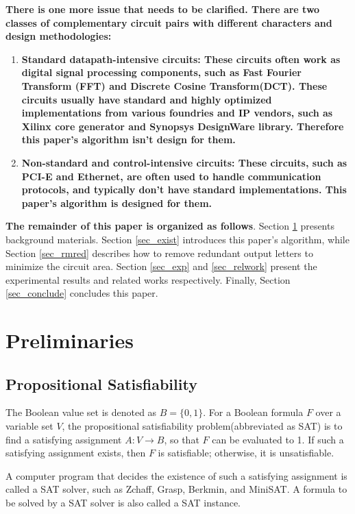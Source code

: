 \documentclass[journal]{IEEEtran}
\begin{document}
\textbf{There is one more issue that needs to be clarified.
There are two classes of complementary circuit pairs with different characters and design methodologies:}
\begin{enumerate}
  \item \textbf{Standard datapath-intensive circuits:
  These circuits often work as digital signal processing components, such as
      Fast Fourier Transform (FFT) and
      Discrete Cosine Transform(DCT).
      These circuits usually have standard and highly optimized implementations from various foundries and IP vendors,
      such as Xilinx core generator\cite{CoreGen} and Synopsys DesignWare library\cite{DesignWare}.
      Therefore this paper's algorithm isn't design for them.}
  \item \textbf{Non-standard and control-intensive circuits:
  These circuits,
  such as PCI-E\cite{PCIESPEC} and Ethernet\cite{IEEE80232002},
  are often used to handle communication protocols,
  and typically don't have standard implementations.
      This paper's algorithm is designed for them.}
\end{enumerate}


\textbf{The remainder of this paper is organized as follows}.
Section \ref{sec_prem} presents background materials.
Section \ref{sec_exist} introduces this paper's algorithm,
while Section \ref{sec_rmred} describes how to remove redundant output letters to minimize the circuit area.
Section \ref{sec_exp} and \ref{sec_relwork} present the experimental results and related works respectively.
Finally,
Section \ref{sec_conclude} concludes this paper.

\section{Preliminaries}\label{sec_prem}


\subsection{Propositional Satisfiability}\label{subsec_SAT}
The Boolean value set is denoted as $B=\{0,1\}$.
For a Boolean formula $F$ over a variable set $V$,
the propositional satisfiability problem(abbreviated as SAT) is to find a satisfying assignment $A:V\to B$,
so that $F$ can be evaluated to 1.
If such a satisfying assignment exists, then $F$ is satisfiable;
otherwise,
it is unsatisfiable.

A computer program that decides the existence of such a satisfying assignment is called a SAT solver,
such as Zchaff\cite{CHAFF}, Grasp\cite{grasp}, Berkmin\cite{BERKMIN},
and MiniSAT\cite{EXTSAT}.
A formula to be solved by a SAT solver is also called a SAT instance.
\end{document}
